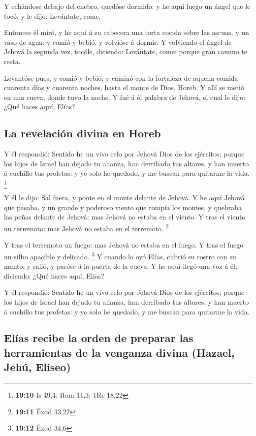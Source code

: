  Y echándose debajo del enebro, quedóse dormido: y he aquí
luego un ángel que le tocó, y le dijo: Levántate, come.

 Entonces él miró, y he aquí á su cabecera una torta
cocida sobre las ascuas, y un vaso de agua: y comió y bebió, y volvióse
á dormir.  Y volviendo el ángel de Jehová la segunda vez,
tocóle, diciendo: Levántate, come: porque gran camino te resta.

 Levantóse pues, y comió y bebió; y caminó con la
fortaleza de aquella comida cuarenta días y cuarenta noches, hasta el
monte de Dios, Horeb.  Y allí se metió en una cueva, donde
tuvo la noche. Y fué á él palabra de Jehová, el cual le dijo: ¿Qué haces
aquí, Elías?

\hypertarget{la-revelaciuxf3n-divina-en-horeb}{%
\subsection{La revelación divina en
Horeb}\label{la-revelaciuxf3n-divina-en-horeb}}

 Y él respondió: Sentido he un vivo celo por Jehová Dios
de los ejércitos; porque los hijos de Israel han dejado tu alianza, han
derribado tus altares, y han muerto á cuchillo tus profetas: y yo solo
he quedado, y me buscan para quitarme la vida. \footnote{\textbf{19:10}
  Is 49,4; Rom 11,3; 1Re 18,22}

 Y él le dijo: Sal fuera, y ponte en el monte delante de
Jehová. Y he aquí Jehová que pasaba, y un grande y poderoso viento que
rompía los montes, y quebraba las peñas delante de Jehová: mas Jehová no
estaba en el viento. Y tras el viento un terremoto: mas Jehová no estaba
en el terremoto. \footnote{\textbf{19:11} Éxod 33,22}

 Y tras el terremoto un fuego: mas Jehová no estaba en el
fuego. Y tras el fuego un silbo apacible y delicado. \footnote{\textbf{19:12}
  Éxod 34,6}  Y cuando lo oyó Elías, cubrió su rostro con
su manto, y salió, y paróse á la puerta de la cueva. Y he aquí llegó una
voz á él, diciendo: ¿Qué haces aquí, Elías?

 Y él respondió: Sentido he un vivo celo por Jehová Dios
de los ejércitos; porque los hijos de Israel han dejado tu alianza, han
derribado tus altares, y han muerto á cuchillo tus profetas: y yo solo
he quedado, y me buscan para quitarme la vida.

\hypertarget{eluxedas-recibe-la-orden-de-preparar-las-herramientas-de-la-venganza-divina-hazael-jehuxfa-eliseo}{%
\subsection{Elías recibe la orden de preparar las herramientas de la
venganza divina (Hazael, Jehú,
Eliseo)}\label{eluxedas-recibe-la-orden-de-preparar-las-herramientas-de-la-venganza-divina-hazael-jehuxfa-eliseo}}

